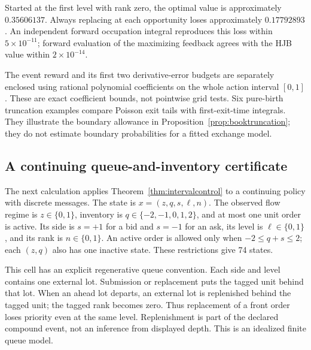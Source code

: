 \documentclass[11pt]{article}
\theoremstyle{plain}
\theoremstyle{definition}
\theoremstyle{remark}
\begin{document}
Started at the first level with rank zero, the optimal value is
approximately \(0.35606137\). Always replacing at each opportunity
loses approximately \(0.17792893\). An independent forward occupation
integral reproduces this loss within \(5\times10^{-11}\); forward
evaluation of the maximizing feedback agrees with the HJB value
within \(2\times10^{-14}\).

The event reward and its first two derivative-error budgets are
separately enclosed using rational polynomial coefficients on the
whole action interval \([0,1]\). These are exact coefficient
bounds, not pointwise grid tests. Six pure-birth truncation examples
compare Poisson exit tails with first-exit-time integrals. They
illustrate the boundary allowance in
Proposition~\ref{prop:booktruncation}; they do not estimate boundary
probabilities for a fitted exchange model.

\subsection{A continuing queue-and-inventory certificate}
\label{sec:intervalexample}

The next calculation applies Theorem~\ref{thm:intervalcontrol} to
a continuing policy with discrete messages. The state is
\(x=(z,q,s,\ell,n)\). The observed flow regime is \(z\in\{0,1\}\),
inventory is \(q\in\{-2,-1,0,1,2\}\), and at most one unit order
is active. Its side is \(s=+1\) for a bid and \(s=-1\) for an ask,
its level is \(\ell\in\{0,1\}\), and its rank is \(n\in\{0,1\}\).
An active order is allowed only when \(-2\le q+s\le2\);
each \((z,q)\) also has one inactive state. These restrictions
give 74 states.

This cell has an explicit regenerative queue convention. Each
side and level contains one external lot. Submission or replacement
puts the tagged unit behind that lot. When an ahead lot departs,
an external lot is replenished behind the tagged unit; the tagged
rank becomes zero. Thus replacement of a front order loses priority
even at the same level. Replenishment is part of the declared
compound event, not an inference from displayed depth. This is an
idealized finite queue model.
\end{document}
